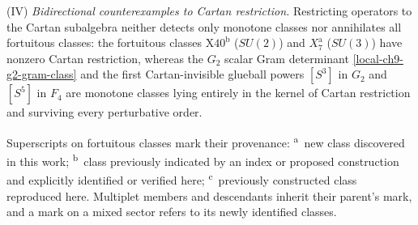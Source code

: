 \documentclass[11pt]{article}
\numberwithin{equation}{section}
\numberwithin{figure}{section}
\numberwithin{table}{section}
\begin{document}
(IV) \emph{Bidirectional counterexamples to Cartan restriction.} Restricting operators to the Cartan subalgebra neither detects only monotone classes nor annihilates all fortuitous classes: the fortuitous classes $\mathrm{X40}^{\mathrm{b}}$ ($SU(2)$) and $X_7^{\mathrm{a}}$ ($SU(3)$) have nonzero Cartan restriction, whereas the $G_2$ scalar Gram determinant \eqref{local-ch9-g2-gram-class} and the first Cartan-invisible glueball powers $[S^3]$ in $G_2$ and $[S^5]$ in $F_4$ are monotone classes lying entirely in the kernel of Cartan restriction and surviving every perturbative order.

\begin{samepage}
Superscripts on fortuitous classes mark their provenance: \textsuperscript{a}~new class discovered in this work; \textsuperscript{b}~class previously indicated by an index or proposed construction and explicitly identified or verified here; \textsuperscript{c}~previously constructed class reproduced here. Multiplet members and descendants inherit their parent's mark, and a mark on a mixed sector refers to its newly identified classes.\par
\end{samepage}
\end{document}
